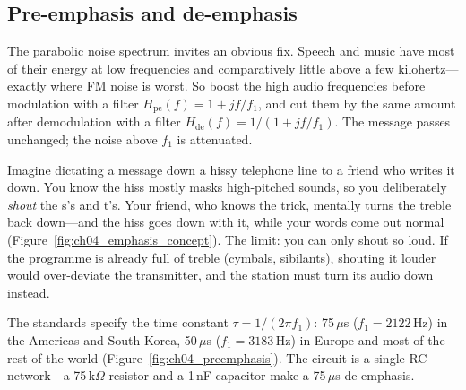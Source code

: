 \subsection{Pre-emphasis and de-emphasis}
\label{sec:ch04:preemph}

The parabolic noise spectrum invites an obvious fix. Speech and music have most of their energy at low
frequencies and comparatively little above a few kilohertz---exactly where FM noise is worst. So boost the
high audio frequencies before modulation with a  filter $H_{\text{pe}}(f)=1+jf/f_1$, and
cut them by the same amount after demodulation with a  filter
$H_{\text{de}}(f)=1/(1+jf/f_1)$. The message passes unchanged; the noise above $f_1$ is attenuated.


\begin{analogy}
Imagine dictating a message down a hissy telephone line to a friend who writes it down. You know the hiss
mostly masks high-pitched sounds, so you deliberately \emph{shout} the s's and t's. Your friend, who knows
the trick, mentally turns the treble back down---and the hiss goes down with it, while your words come out
normal (Figure~\ref{fig:ch04_emphasis_concept}). The limit: you can only shout so loud. If the programme is
already full of treble (cymbals, sibilants), shouting it louder would over-deviate the transmitter, and the
station must turn its audio down instead.
\end{analogy}

The standards specify the time constant $\tau=1/(2\pi f_1)$: 75\,$\mu$s ($f_1=2122$\,Hz) in the Americas and
South Korea, 50\,$\mu$s ($f_1=3183$\,Hz) in Europe and most of the rest of the world
(Figure~\ref{fig:ch04_preemphasis}). The circuit is a single RC network---a 75\,k$\Omega$ resistor and a 1\,nF
capacitor make a 75\,$\mu$s de-emphasis.


